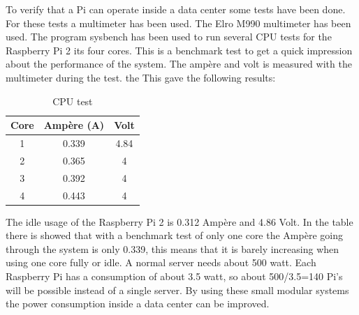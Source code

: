 \documentclass{sig-alternate-br}
\begin{document}
To verify that a Pi can operate inside a data center some tests have been done. For these tests a multimeter has been used. The Elro M990 multimeter has been used. The program sysbench has been used to run several CPU tests for the Raspberry Pi 2 its four cores. This is a benchmark test to get a quick impression about the performance of the system. The ampère and volt is measured with the multimeter during the test. the This gave the following results:
\begin{table}[H]
	\centering \caption{CPU test}
	\begin{tabular}{|c|c|c|} \hline
		Core & Ampère (A) & Volt\\ \hline
		1 & 0.339 & 4.84 \\ \hline
		2 & 0.365 & 4 \\ \hline
		3 & 0.392 & 4 \\ \hline
		4 & 0.443 & 4 \\ \hline
	\end{tabular}
	\label{tab:cpu}
\end{table}

The idle usage of the Raspberry Pi 2 is 0.312 Ampère and 4.86 Volt. In the table there is showed that with a benchmark test of only one core the Ampère going through the system is only 0.339, this means that it is barely increasing when using one core fully or idle. A normal server needs about 500 watt. Each Raspberry Pi has a consumption of about 3.5 watt, so about 500/3.5=140 Pi's will be possible instead of a single server. By using these small modular systems the power consumption inside a data center can be improved. 
\end{document}
